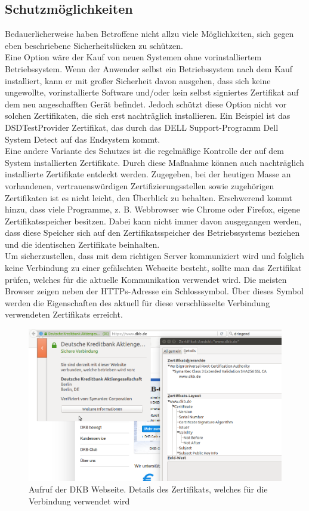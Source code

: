 \subsection{Schutzmöglichkeiten}
\label{sub:schutz}
Bedauerlicherweise haben Betroffene nicht allzu viele Möglichkeiten, sich gegen eben beschriebene Sicherheitslücken zu schützen. 
\\Eine Option wäre der Kauf von neuen Systemen ohne vorinstalliertem Betriebssystem. Wenn der Anwender selbst ein Betriebssystem nach dem Kauf installiert, kann er mit großer Sicherheit davon ausgehen, dass sich keine ungewollte, vorinstallierte Software und/oder kein selbst signiertes Zertifikat auf dem neu angeschafften Gerät befindet. Jedoch schützt diese Option nicht vor solchen Zertifikaten, die sich erst nachträglich installieren. Ein Beispiel ist das DSDTestProvider Zertifikat, das durch das DELL Support-Programm Dell System Detect auf das Endsystem kommt. \cite[vgl.]{dell}
\\Eine andere Variante des Schutzes ist die regelmäßige Kontrolle der auf dem System installierten Zertifikate. Durch diese Maßnahme können auch nachträglich installierte Zertifikate entdeckt werden. Zugegeben, bei der heutigen Masse an vorhandenen, vertrauenswürdigen Zertifizierungsstellen sowie zugehörigen Zertifikaten ist es nicht leicht, den Überblick zu behalten. Erschwerend kommt hinzu, dass viele Programme, z. B. Webbrowser wie Chrome oder Firefox, eigene Zertifikatsspeicher besitzen. Dabei kann nicht immer davon ausgegangen werden, dass diese Speicher sich auf den Zertifikatsspeicher des Betriebssystems beziehen und die identischen Zertifikate beinhalten.\\
Um sicherzustellen, dass mit dem richtigen Server kommuniziert wird und folglich keine Verbindung zu einer gefälschten Webseite besteht, sollte man das Zertifikat prüfen, welches für die aktuelle Kommunikation verwendet wird. Die meisten Browser zeigen neben der HTTPs-Adresse ein Schlosssymbol. Über dieses Symbol werden die Eigenschaften des aktuell für diese verschlüsselte Verbindung verwendeten Zertifikats erreicht. 
\begin{figure}[H]
	\centering
	\includegraphics[width=.7\linewidth]{images/ca_dkb.png}
	\caption{Aufruf der DKB Webseite. Details des Zertifikats, welches für die Verbindung verwendet wird}
\end{figure}
